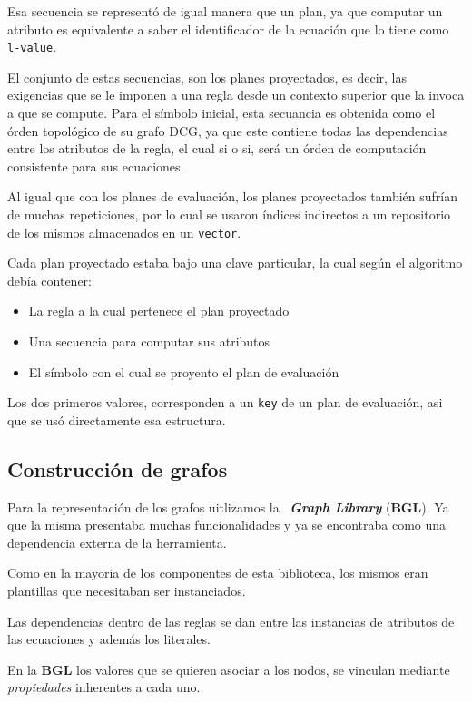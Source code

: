 Esa secuencia se representó de igual manera que un plan, ya que computar un atributo es equivalente a saber el identificador de la ecuación que lo tiene como \texttt{l-value}.

El conjunto de estas secuencias, son los planes proyectados, es decir, las exigencias que se le imponen a una regla desde un contexto superior que la invoca a que se compute. Para el símbolo inicial, esta secuancia es obtenida como el órden topológico de su grafo DCG, ya que este contiene todas las dependencias entre los atributos de la regla, el cual si o si, será un órden de computación consistente para sus ecuaciones.

Al igual que con los planes de evaluación, los planes proyectados también sufrían de muchas repeticiones, por lo cual se usaron índices indirectos a un repositorio de los mismos almacenados en un \texttt{vector}.

Cada plan proyectado estaba bajo una clave particular, la cual según el algoritmo debía contener:
\begin{itemize}
\item La regla a la cual pertenece el plan proyectado
\item Una secuencia para computar sus atributos
\item El símbolo con el cual se proyento el plan de evaluación
\end{itemize}

Los dos primeros valores, corresponden a un \texttt{key} de un plan de evaluación, asi que se usó directamente esa estructura.

\subsection{Construcción de grafos}

Para la representación de los grafos uitlizamos la \boost\ \textit{\textbf{Graph Library}} (\textbf{BGL}). Ya que la misma presentaba muchas funcionalidades y ya se encontraba como una dependencia externa de la herramienta.

Como en la mayoria de los componentes de esta biblioteca, los mismos eran plantillas que necesitaban ser instanciados.

Las dependencias dentro de las reglas se dan entre las instancias de atributos de las ecuaciones y además los literales.

En la \textbf{BGL} los valores que se quieren asociar a los nodos, se vinculan mediante \textit{propiedades} inherentes a cada uno.

